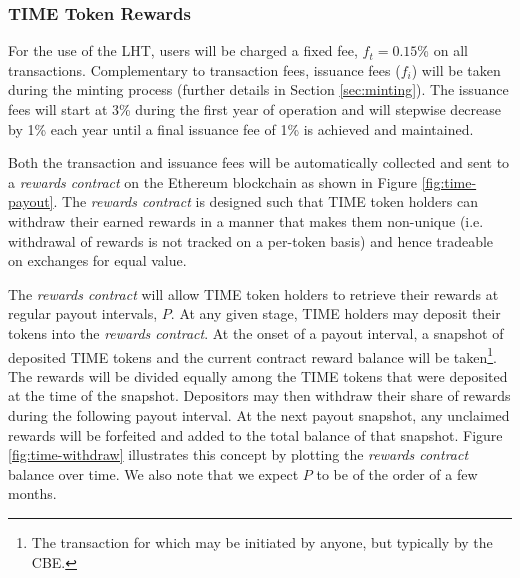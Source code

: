 \begin{multicols}{2}
\subsubsection{TIME Token Rewards}
\label{sec:TIME-rewards}

For the use of the LHT, users will be charged a fixed fee, $f_t = \num{0.15}$\%  on all transactions. Complementary to transaction fees, issuance fees ($f_i$) will be taken during the minting process (further details in Section \ref{sec:minting}). The issuance fees will start at 3\% during the first year of operation and will stepwise decrease by 1\% each year until a final issuance fee of 1\% is achieved and maintained. 

Both the transaction and issuance fees will be automatically collected and sent to a \textit{rewards contract} on the Ethereum blockchain as shown in Figure \ref{fig:time-payout}. The \textit{rewards contract} is designed such that TIME token holders can withdraw their earned rewards in a manner that makes them non-unique (i.e. withdrawal of rewards is not tracked on a per-token basis) and hence tradeable on exchanges for equal value.

The \textit{rewards contract} will allow TIME token holders to retrieve their rewards at regular payout intervals, $P$. At any given stage, TIME holders may deposit their tokens into the \textit{rewards contract}. At the onset of a payout interval, a snapshot of deposited TIME tokens and the current contract reward balance will be taken\footnote{The transaction for which may be initiated by anyone, but typically by the CBE.}. The rewards will be divided equally among the TIME tokens that were deposited at the time of the snapshot. Depositors may then withdraw their share of rewards during the following payout interval. At the next payout snapshot, any unclaimed rewards will be forfeited and added to the total balance of that snapshot. Figure \ref{fig:time-withdraw} illustrates this concept by plotting the \textit{rewards contract} balance over time. We also note that we expect $P$ to be of the order of a few months.  


\end{multicols}
